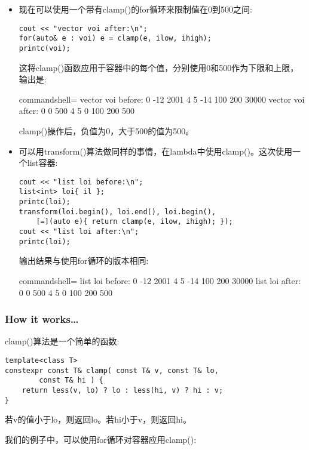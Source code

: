 \begin{itemize}
\item 
现在可以使用一个带有clamp()的for循环来限制值在0到500之间:

\begin{lstlisting}[style=styleCXX]
cout << "vector voi after:\n";
for(auto& e : voi) e = clamp(e, ilow, ihigh);
printc(voi);
\end{lstlisting}

这将clamp()函数应用于容器中的每个值，分别使用0和500作为下限和上限，输出是:

\begin{tcblisting}{commandshell={}}
vector voi before:
0 -12 2001 4 5 -14 100 200 30000
vector voi after:
0 0 500 4 5 0 100 200 500
\end{tcblisting}

clamp()操作后，负值为0，大于500的值为500。

\item 
可以用transform()算法做同样的事情，在lambda中使用clamp()。这次使用一个list容器:

\begin{lstlisting}[style=styleCXX]
cout << "list loi before:\n";
list<int> loi{ il };
printc(loi);
transform(loi.begin(), loi.end(), loi.begin(),
	[=](auto e){ return clamp(e, ilow, ihigh); });
cout << "list loi after:\n";
printc(loi);
\end{lstlisting}

输出结果与使用for循环的版本相同:

\begin{tcblisting}{commandshell={}}
list loi before:
0 -12 2001 4 5 -14 100 200 30000
list loi after:
0 0 500 4 5 0 100 200 500
\end{tcblisting}
\end{itemize}

\subsubsection{How it works…}

clamp()算法是一个简单的函数:

\begin{lstlisting}[style=styleCXX]
template<class T>
constexpr const T& clamp( const T& v, const T& lo,
		const T& hi ) {
	return less(v, lo) ? lo : less(hi, v) ? hi : v;
}
\end{lstlisting}

若v的值小于lo，则返回lo。若hi小于v，则返回hi。

我们的例子中，可以使用for循环对容器应用clamp():

